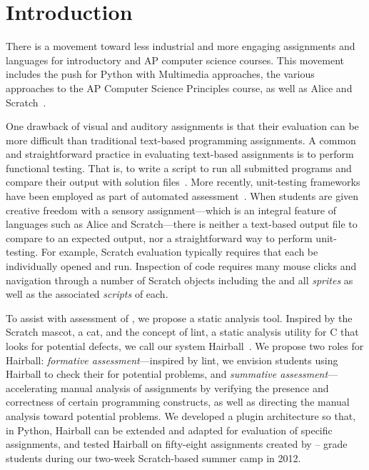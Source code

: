 \section{Introduction}
There is a movement toward less industrial and more engaging assignments and
languages for introductory and AP computer science courses.  This movement
includes the push for Python with Multimedia approaches, the various approaches
to the AP Computer Science Principles course, as well as Alice and
Scratch~\cite{Adams:2012:SLP:2157136.2157319, Forte:2004:CCC:962752.962945,
  Simon:2010:ERC:1822090.1822151, Snyder:2012:FFC:2189835.2189852,
  Cooper:2003:TOI:611892.611966, Maloney:2010:SPL:1868358.1868363}.

One drawback of visual and auditory assignments is that their evaluation can be
more difficult than traditional text-based programming assignments.  A common
and straightforward practice in evaluating text-based assignments is to perform
functional testing. That is, to write a script to run all submitted programs
and compare their output with solution
files~\cite{Jackson:1997:GSP:268084.268210}.  More recently, unit-testing
frameworks have been employed as part of automated
assessment~\cite{Spacco:2006:EMD:1140124.1140131,
  Edwards:2003:RCS:949344.949390}.  When students are given creative freedom
with a sensory assignment---which is an integral feature of languages such as
Alice and Scratch---there is neither a text-based output file to compare to an
expected output, nor a straightforward way to perform unit-testing.  For
example, Scratch evaluation typically requires that each \sprogram{} be
individually opened and run.  Inspection of \sprogram{} code requires many
mouse clicks and navigation through a number of Scratch objects including the
\stage{} and all \emph{sprites} as well as the associated \emph{scripts} of
each.

To assist with assessment of , we propose a static analysis tool.
Inspired by the Scratch mascot, a cat, and the concept of lint, a static
analysis utility for C that looks for potential defects, we call our system
Hairball~\cite{Johnson78lint}. We propose two roles for Hairball:
\emph{formative assessment}---inspired by lint, we envision students using
Hairball to check their  for potential problems, and
\emph{summative assessment}---accelerating manual analysis of assignments by
verifying the presence and correctness of certain programming constructs, as
well as directing the manual analysis toward potential problems. We developed a
plugin architecture so that, in Python, Hairball can be extended and adapted
for evaluation of specific assignments, and tested Hairball on fifty-eight
assignments created by -- grade students during our two-week
Scratch-based summer camp in 2012.

